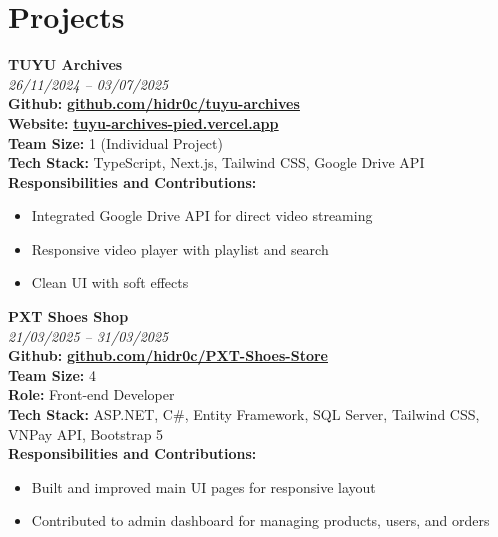 \documentclass[a4paper,11pt]{article}
\begin{document}
\section{Projects}
\begin{minipage}[t]{\linewidth}
  \textbf{TUYU Archives} \\
  \small\textit{26/11/2024 – 03/07/2025} \\
  \textbf{Github:} \href{https://github.com/hidr0c/tuyu-archives}{\textbf{\underline{github.com/hidr0c/tuyu-archives}}} \\
  \textbf{Website:} \href{https://tuyu-archives-pied.vercel.app}{\textbf{\underline{tuyu-archives-pied.vercel.app}}} \\
  \textbf{Team Size:} 1 (Individual Project) \\
  \textbf{Tech Stack:} TypeScript, Next.js, Tailwind CSS, Google Drive API \\
  \textbf{Responsibilities and Contributions: }
  \begin{itemize}[nosep,leftmargin=1.2em,itemsep=2pt]
    \item Integrated Google Drive API for direct video streaming
    \item Responsive video player with playlist and search
    \item Clean UI with soft effects
  \end{itemize}
\end{minipage}

\vspace{0.5em}

\begin{minipage}[t]{\linewidth}
  \textbf{PXT Shoes Shop} \\
  \small\textit{21/03/2025 – 31/03/2025} \\
  \textbf{Github:} \href{https://github.com/hidr0c/PXT-Shoes-Store}{\textbf{\underline{github.com/hidr0c/PXT-Shoes-Store}}} \\
  \textbf{Team Size:} 4 \\
  \textbf{Role:} Front-end Developer \\
  \textbf{Tech Stack:} ASP.NET, C\#, Entity Framework, SQL Server, Tailwind CSS, VNPay API, Bootstrap 5 \\
  \textbf{Responsibilities and Contributions:}
  \begin{itemize}[nosep,leftmargin=1.2em,itemsep=2pt]
    \item Built and improved main UI pages for responsive layout
    \item Contributed to admin dashboard for managing products, users, and orders
  \end{itemize}
\end{minipage}
\end{document}
